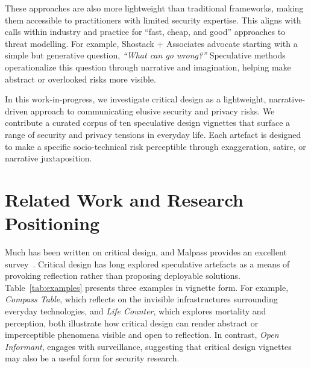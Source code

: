 These approaches are also more lightweight than traditional frameworks, making them accessible to practitioners with limited security expertise. This aligns with calls within industry and practice for ``fast, cheap, and good'' approaches to threat modelling. For example, Shostack + Associates \cite{shostack_fast_cheap_good} advocate starting with a simple but generative question, \textit{``What can go wrong?''}  Speculative methods operationalize this question through narrative and imagination, helping make abstract or overlooked risks more visible.

In this work-in-progress, we investigate critical design as a lightweight, narrative-driven approach to communicating elusive security and privacy risks. We contribute a curated corpus of ten speculative design vignettes that surface a range of security and privacy tensions in everyday life. Each artefact is designed to make a specific socio-technical risk perceptible through exaggeration, satire, or narrative juxtaposition. 


\section{Related Work and Research Positioning}

Much has been written on critical design, and Malpass provides an excellent survey~\cite{Mal17}. Critical design has long explored speculative artefacts as a means of provoking reflection rather than proposing deployable solutions. Table~\ref{tab:examples} presents three examples in vignette form. For example, \textit{Compass Table}, which reflects on the invisible infrastructures surrounding everyday technologies, and \textit{Life Counter}, which explores mortality and perception, both illustrate how critical design can render abstract or imperceptible phenomena visible and open to reflection. In contrast, \textit{Open Informant}, engages with surveillance, suggesting that critical design vignettes may also be a useful form for security research. 


